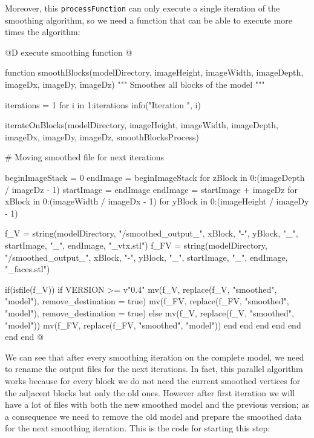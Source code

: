 \documentclass[11pt,oneside]{article}	%
\begin{document}
Moreover, this \texttt{processFunction} can only execute a single iteration of the smoothing algorithm, so we need a function that can be able to execute more times the algorithm:

@D execute smoothing function
@{function smoothBlocks(modelDirectory,
                      imageHeight, imageWidth, imageDepth,
                      imageDx, imageDy, imageDz)
  """
  Smoothes all blocks of the
  model
  """
   
  iterations = 1
  for i in 1:iterations
    info("Iteration ", i)

    iterateOnBlocks(modelDirectory,
                    imageHeight, imageWidth, imageDepth,
                    imageDx, imageDy, imageDz,
                    smoothBlocksProcess)

    # Moving smoothed file for next iterations

    beginImageStack = 0
    endImage = beginImageStack
    for zBlock in 0:(imageDepth / imageDz - 1)
      startImage = endImage
      endImage = startImage + imageDz
      for xBlock in 0:(imageWidth / imageDx - 1)
        for yBlock in 0:(imageHeight / imageDy - 1)

          f_V = string(modelDirectory, "/smoothed_output_", xBlock, "-", yBlock, "_",
                       startImage, "_", endImage, "_vtx.stl")
          f_FV = string(modelDirectory, "/smoothed_output_", xBlock, "-", yBlock, "_",
                        startImage, "_", endImage, "_faces.stl")

          if(isfile(f_V))
            if VERSION >= v"0.4"
              mv(f_V, replace(f_V, "smoothed", "model"), remove_destination = true)
              mv(f_FV, replace(f_FV, "smoothed", "model"), remove_destination = true)
            else
              mv(f_V, replace(f_V, "smoothed", "model"))
              mv(f_FV, replace(f_FV, "smoothed", "model"))
            end
          end
        end
      end
    end
  end
end @}

We can see that after every smoothing iteration on the complete model, we need to rename the output files for the next iterations. In fact, this parallel algorithm works because for every block we do not need the current smoothed vertices for the adjacent blocks but only the old ones. However after first iteration we will have a lot of files with both the new smoothed model and the previous version; as a consequence we need to remove the old model and prepare the smoothed data for the next smoothing iteration.
This is the code for starting this step:
\end{document}
